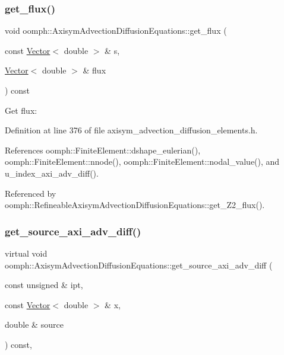 \subsubsection{\texorpdfstring{get\+\_\+flux()}{get\_flux()}}
{\footnotesize\ttfamily void oomph\+::\+Axisym\+Advection\+Diffusion\+Equations\+::get\+\_\+flux (\begin{DoxyParamCaption}\item[{const \hyperlink{classoomph_1_1Vector}{Vector}$<$ double $>$ \&}]{s,  }\item[{\hyperlink{classoomph_1_1Vector}{Vector}$<$ double $>$ \&}]{flux }\end{DoxyParamCaption}) const\hspace{0.3cm}{\ttfamily [inline]}}



Get flux\+: 



Definition at line 376 of file axisym\+\_\+advection\+\_\+diffusion\+\_\+elements.\+h.



References oomph\+::\+Finite\+Element\+::dshape\+\_\+eulerian(), oomph\+::\+Finite\+Element\+::nnode(), oomph\+::\+Finite\+Element\+::nodal\+\_\+value(), and u\+\_\+index\+\_\+axi\+\_\+adv\+\_\+diff().



Referenced by oomph\+::\+Refineable\+Axisym\+Advection\+Diffusion\+Equations\+::get\+\_\+\+Z2\+\_\+flux().

\mbox{\label{classoomph_1_1AxisymAdvectionDiffusionEquations_ac1e5dd8bfd42847320137152e3bd3e41}} 
\subsubsection{\texorpdfstring{get\+\_\+source\+\_\+axi\+\_\+adv\+\_\+diff()}{get\_source\_axi\_adv\_diff()}}
{\footnotesize\ttfamily virtual void oomph\+::\+Axisym\+Advection\+Diffusion\+Equations\+::get\+\_\+source\+\_\+axi\+\_\+adv\+\_\+diff (\begin{DoxyParamCaption}\item[{const unsigned \&}]{ipt,  }\item[{const \hyperlink{classoomph_1_1Vector}{Vector}$<$ double $>$ \&}]{x,  }\item[{double \&}]{source }\end{DoxyParamCaption}) const\hspace{0.3cm}{\ttfamily [inline]}, {\ttfamily [virtual]}}



